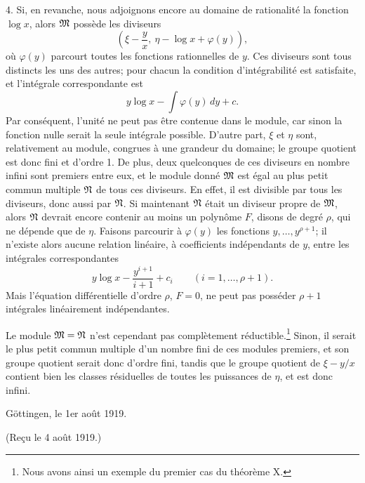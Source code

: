 4. Si, en revanche, nous adjoignons encore au domaine de rationalité la fonction $\log x$, alors $\mathfrak{M}$ possède les diviseurs
\[
 \left(\xi-\frac{y}{x},\ \eta-\log x+\varphi(y)\right),
\]
où $\varphi(y)$ parcourt toutes les fonctions rationnelles de $y$. Ces diviseurs sont tous distincts les uns des autres; pour chacun la condition d'intégrabilité est satisfaite, et l'intégrale correspondante est
\[
 y\log x-\int\varphi(y)\,dy+c.
\]
Par conséquent, l'unité ne peut pas être contenue dans le module, car sinon la fonction nulle serait la seule intégrale possible. D'autre part, $\xi$ et $\eta$ sont, relativement au module, congrues à une grandeur du domaine; le groupe quotient est donc fini et d'ordre 1. De plus, deux quelconques de ces diviseurs en nombre infini sont premiers entre eux, et le module donné $\mathfrak{M}$ est égal au plus petit commun multiple $\mathfrak{N}$ de tous ces diviseurs. En effet, il est divisible par tous les diviseurs, donc aussi par $\mathfrak{N}$. Si maintenant $\mathfrak{N}$ était un diviseur propre de $\mathfrak{M}$, alors $\mathfrak{N}$ devrait encore contenir au moins un polynôme $F$, disons de degré $\rho$, qui ne dépende que de $\eta$. Faisons parcourir à $\varphi(y)$ les fonctions $y,\ldots,y^{\rho+1}$; il n'existe alors aucune relation linéaire, à coefficients indépendants de $y$, entre les intégrales correspondantes
\[
 y\log x-\frac{y^{i+1}}{i+1}+c_i\qquad(i=1,\ldots,\rho+1).
\]
Mais l'équation différentielle d'ordre $\rho$, $F=0$, ne peut pas posséder $\rho+1$ intégrales linéairement indépendantes.

Le module $\mathfrak{M}=\mathfrak{N}$ n'est cependant pas complètement réductible.\footnote{Nous avons ainsi un exemple du premier cas du théorème X.} Sinon, il serait le plus petit commun multiple d'un nombre fini de ces modules premiers, et son groupe quotient serait donc d'ordre fini, tandis que le groupe quotient de $\xi-y/x$ contient bien les classes résiduelles de toutes les puissances de $\eta$, et est donc infini.

Göttingen, le 1er août 1919.

\begin{center}
(Reçu le 4 août 1919.)
\end{center}
